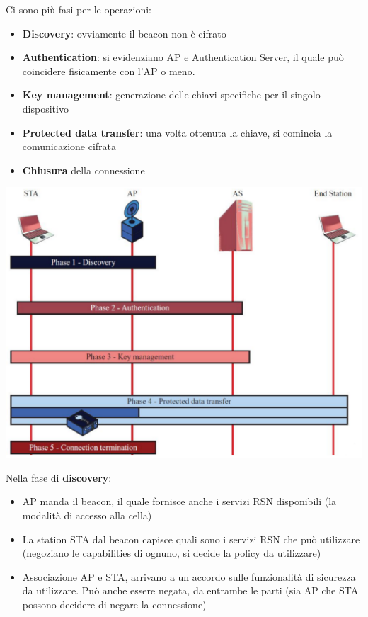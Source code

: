 Ci sono più fasi per le operazioni:
\begin{itemize}
	\item \textbf{Discovery}: ovviamente il beacon non è cifrato
    
	\item \textbf{Authentication}: si evidenziano AP e Authentication Server, il quale può coincidere fisicamente con l'AP o meno.
	
    \item \textbf{Key management}: generazione delle chiavi specifiche per il singolo dispositivo
	
    \item \textbf{Protected data transfer}: una volta ottenuta la chiave, si comincia la comunicazione cifrata
	
    \item \textbf{Chiusura} della connessione
\end{itemize} 
\begin{center}
	\includegraphics[width=0.95\linewidth]{img/wlan/fasop}
\end{center}

Nella fase di \textbf{discovery}: 
\begin{itemize}
	\item AP manda il beacon, il quale fornisce anche i servizi RSN disponibili (la modalità di accesso alla cella)
    
	\item La station STA dal beacon capisce quali sono i servizi RSN che può utilizzare (negoziano le capabilities di ognuno, si decide la policy da utilizzare)

	\item Associazione AP e STA, arrivano a un accordo sulle funzionalità di sicurezza da utilizzare. Può anche essere negata, da entrambe le parti (sia AP che STA possono decidere di negare la connessione)
\end{itemize}

